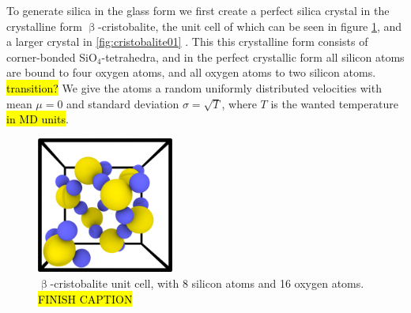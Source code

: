 To generate silica in the glass form we first create a perfect silica crystal in the crystalline form $\upbeta$-cristobalite, the unit cell of which can be seen in figure \cref{fig:beta_cristobalite-unit_cell}, and a larger crystal in \cref{fig:cristobalite01} . This this crystalline form consists of corner-bonded SiO$_4$-tetrahedra, and in the perfect crystallic form all silicon atoms are bound to four oxygen atoms, and all oxygen atoms to two silicon atoms. \hl{transition?} We give the atoms a random uniformly distributed velocities with mean $\mu = 0$ and standard deviation $\sigma = \sqrt{T}$, where $T$ is the wanted temperature \hl{in MD units}.
%
\begin{figure}[htpb]%
    \centering%
    \includegraphics[width=0.4\textwidth]{images/beta_cristobalite/unit_cell05_cropped.png}%
    \caption{%
        $\upbeta$-cristobalite unit cell, with 8 silicon atoms and 16 oxygen atoms. \hl{FINISH CAPTION}%
    }%
    \label{fig:beta_cristobalite-unit_cell}%
\end{figure}%

